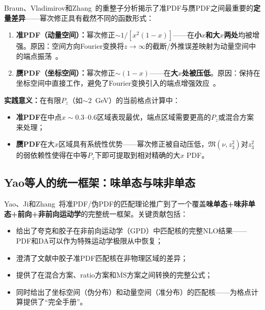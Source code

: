 \documentclass[12pt,a4paper]{ctexart}
\theoremstyle{definition}
\begin{document}
Braun、Vladimirov和Zhang~\cite{Braun2019power}的重整子分析揭示了准PDF与赝PDF之间最重要的\textbf{定量差异}——幂次修正具有截然不同的函数形式：

\begin{enumerate}[leftmargin=*]
    \item \textbf{准PDF（动量空间）：}幂次修正$\sim 1/[x^2(1-x)]$——在\textbf{小$x$和大$x$两处}均被增强。原因：空间方向Fourier变换将$z\to\infty$的截断/外推误差映射为动量空间中的端点振荡~\cite{Braun2019power}。

    \item \textbf{赝PDF（坐标空间）：}幂次修正$\sim (1-x)$——在\textbf{大$x$处被压低}。原因：保持在坐标空间中直接工作，避免了Fourier变换引入的端点增强效应~\cite{Braun2019power}。
\end{enumerate}

\textbf{实践意义：}在有限$P_z$（如$\sim 2$~GeV）的当前格点计算中：
\begin{itemize}[nosep]
    \item \textbf{准PDF}在中点$x \sim 0.3\text{--}0.6$区域表现最优，端点区域需要更高的$P_z$或混合方案来处理；
    \item \textbf{赝PDF}在大$x$区域具有系统性优势——幂次修正被自动压低，$\mathfrak{M}(\nu, z_3^2)$对$z_3^2$的弱依赖性使得在中等$P_z$下即可提取到相对精确的大$x$ PDF。
\end{itemize}

\subsection{Yao等人的统一框架：味单态与味非单态}

Yao、Ji和Zhang~\cite{Yao2023connecting}将准PDF/伪PDF的匹配理论推广到了一个覆盖\textbf{味单态+味非单态+前向+非前向运动学}的完整统一框架。关键贡献包括：

\begin{itemize}[nosep]
    \item 给出了夸克和胶子在非前向运动学（GPD）中匹配核的完整NLO结果——PDF和DA可以作为特殊运动学极限从中恢复；
    \item 澄清了文献中胶子准PDF匹配核在非物理区域的差异；
    \item 提供了在混合方案、ratio方案和$\overline{\text{MS}}$方案之间转换的完整公式；
    \item 同时给出了坐标空间（伪分布）和动量空间（准分布）的匹配核——为格点计算提供了``完全手册''。
\end{itemize}

\end{document}
